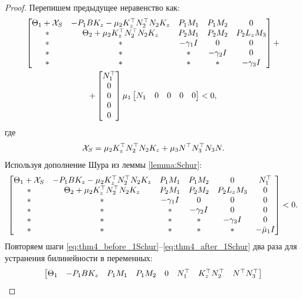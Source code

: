 \begin{proof}
Перепишем предыдущее неравенство как:
	\begin{multline}
		\label{eq:thm4_before_1Schur}
	\begin{bmatrix}
		{\Theta}_1 + \mathcal{X}_{S} & -{P}_1{B}{K}_z -\mu_2{K}_z^\top{N}_2^\top{N}_2{K}_z & {P}_1{M}_1 & {P}_1{M}_2 &0 \\
		* &    {\Theta}_2 + \mu_2{K}_z^\top{N}_2^\top{N}_2{K}_z & {P}_2{M}_1 & {P}_2{M}_2 & {P}_2{L}_z{M}_3\\
		* & * & -\gamma_1{I} & 0&0\\
		* & * & * & -\gamma_2{I}&0 \\
		* & * & * & *&-\gamma_3{I}
	\end{bmatrix} + \\
	+ \begin{bmatrix}
		N_1^\top \\ 0 \\0\\0\\0
	\end{bmatrix} \mu_1
	\begin{bmatrix}
		N_1 & 0 & 0 & 0&0
	\end{bmatrix}
	<0,
\end{multline}
	где
%
\begin{equation}
	\mathcal{X}_{S}=\mu_2{K}_z^\top{N}_2^\top{N}_2{K}_z+\mu_3{N}^\top{N}_3^\top{N}_3{N}.
\end{equation}
Используя дополнение Шура из леммы \ref{lemma:Schur}:
	\begin{equation}
	\label{eq:thm4_after_1Schur}
	\begin{bmatrix}
		{\Theta}_1 + \mathcal{X}_{S} & -{P}_1{B}{K}_z -\mu_2{K}_z^\top{N}_2^\top{N}_2{K}_z & {P}_1{M}_1 & {P}_1{M}_2 &0 & N_1^\top\\
		* &    {\Theta}_2 + \mu_2{K}_z^\top{N}_2^\top{N}_2{K}_z & {P}_2{M}_1 & {P}_2{M}_2 & {P}_2{L}_z{M}_3 &0\\
		* & * & -\gamma_1{I} & 0&0&0\\
		* & * & * & -\gamma_2{I}&0&0 \\
		* & * & * & *&-\gamma_3{I}&0 \\
			* & * & * & *& *& -\bar{\mu}_1{I}
	\end{bmatrix}
	<0.
\end{equation}
Повторяем шаги \eqref{eq:thm4_before_1Schur}--\eqref{eq:thm4_after_1Schur} два раза для устранения билинейности в переменных:
	\begin{equation}
		\label{eq:thm4_after_Schur}
		\begin{bmatrix}
			{\Theta}_1 & -{P}_1{B}{K}_z & {P}_1{M}_1 & {P}_1{M}_2 & 0 & {N}_1^\top & {K}_z^\top{N}_2^\top & {N}^\top{N}_3^\top 

\end{bmatrix}
\end{equation}
\end{proof}
